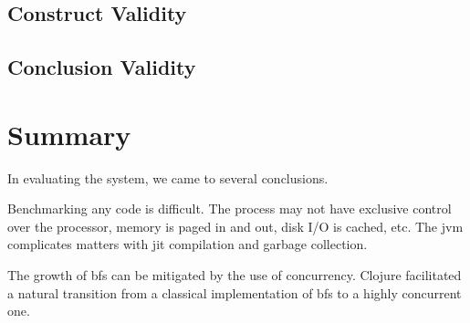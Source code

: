 		
		\subsection{Construct Validity}
		\label{sec:construct-validity}
			
		
		\subsection{Conclusion Validity}
		\label{sec:conclusion-validity}
			
	
	\section{Summary}
	\label{sec:eval-summary}
		In evaluating the system, we came to several conclusions.
		
		Benchmarking any code is difficult.  The process may not have exclusive control over the processor, memory is paged in and out, disk I/O is cached, etc.  The \gls{jvm} complicates matters with \gls{jit} compilation and garbage collection.
		
		The growth of \gls{bfs} can be mitigated by the use of concurrency.  Clojure facilitated a natural transition from a classical implementation of \gls{bfs} to a highly concurrent one.